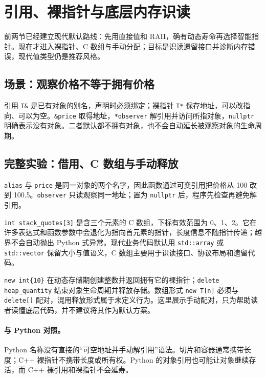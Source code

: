 \section{引用、裸指针与底层内存识读}

前两节已经建立现代默认路线：先用直接值和 RAII，确有动态寿命再选择智能指针。现在才进入裸指针、C 数组与手动分配；目标是识读遗留接口并诊断内存错误，现代值类型仍是推荐风格。

\subsection{场景：观察价格不等于拥有价格}

引用 \texttt{T\&} 是已有对象的别名，声明时必须绑定；裸指针 \texttt{T*} 保存地址，可以改指向、可以为空。\texttt{\&price} 取得地址，\texttt{*observer} 解引用并访问所指对象，\texttt{nullptr} 明确表示没有对象。二者默认都不拥有对象，也不会自动延长被观察对象的生命周期。

\subsection{完整实验：借用、C 数组与手动释放}



\texttt{alias} 与 \texttt{price} 是同一对象的两个名字，因此函数通过可变引用把价格从 100 改到 100.5。\texttt{observer} 只读观察同一地址；置为 \texttt{nullptr} 后，程序先检查再避免解引用。

\texttt{int stack\_quotes[3]} 是含三个元素的 C 数组，下标有效范围为 0、1、2。它在许多表达式和函数参数中会退化为指向首元素的指针，长度信息不随指针传递；越界不会自动抛出 Python 式异常。现代业务代码默认用 \texttt{std::array} 或 \texttt{std::vector} 保留大小与值语义，C 数组主要用于识读接口、协议布局和遗留代码。

\texttt{new int\{10\}} 在动态存储期创建整数并返回拥有它的裸指针；\texttt{delete heap\_quantity} 结束对象生命周期并释放存储。数组形式 \texttt{new T[n]} 必须与 \texttt{delete[]} 配对，混用释放形式属于未定义行为。这里展示手动配对，只为帮助读者读懂底层代码，并不建议将其作为默认方案。

\paragraph{与 Python 对照。}
Python 名称没有直接的“可空地址并手动解引用”语法。切片和容器通常携带长度；C++ 裸指针不携带长度或所有权。Python 的对象引用也可能让对象继续存活，而 C++ 裸引用和裸指针不会延寿。

